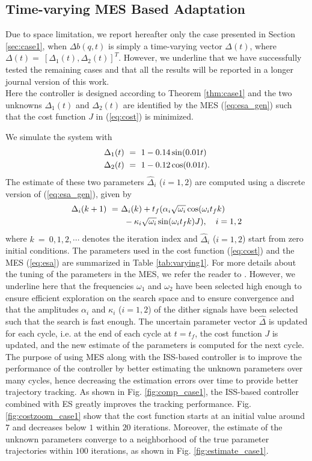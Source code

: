 \documentclass[twoside,leqno,onecolumn]{article}
\begin{document}
\subsection{Time-varying MES Based Adaptation}
\label{sec:constant} Due to space limitation, we report hereafter
only the case presented in Section \ref{sec:case1}, when $\Delta
b(q,t)$ is simply a time-varying vector $\Delta(t) $, where
$\Delta(t)  =~[\Delta_1(t), \Delta_2(t)]^T$. However, we underline
that we have successfully tested the remaining cases and that all
the results will be reported in a longer journal version of
this work.\\
Here the controller is designed according to Theorem
\ref{thm:case1} and the two unknowns $\Delta_1(t)$ and
$\Delta_2(t)$ are identified by the MES (\ref{eq:esa_gen}) such
that the cost function $J$ in (\ref{eq:cost}) is minimized.

We simulate the system with
\begin{align}
\label{eq:time-varying}
 {\Delta }_1(t)~&=~1 - 0.14\sin(0.01t)\notag\\
 {\Delta }_2(t)~&=~1 - 0.12\cos(0.01t).
\end{align}
The estimate of these two parameters $\widehat{\Delta}_i$ ($i =
1,2$) are computed using a discrete version of (\ref{eq:esa_gen}),
given by
\begin{align}
{\Delta}_i (k+1) ~=&~\Delta_i(k) + t_f(\alpha_i\sqrt{\omega_i}\cos(\omega_i t_f k)\notag\\
&~~-\kappa_i \sqrt{\omega_i} \sin(\omega_i t_f  k) J), \quad i
=1,2 \label{eq:esa}
\end{align}
where $k ~=~0,1,2,\cdots$ denotes the iteration index and
$\widehat{\Delta}_i$ ($i = 1,2$) start from zero initial
conditions. The parameters used in the cost function
(\ref{eq:cost}) and the MES (\ref{eq:esa}) are summarized in Table
\ref{tab:varying1}. For more details about the tuning of the
parameters in the MES, we refer the reader to \cite{Ariy03}.
However, we underline here that the frequencies $\omega_1$ and
$\omega_2$ have been selected high enough to ensure efficient
exploration on the search space and to ensure convergence and that
the amplitudes $\alpha_i$ and $\kappa_i$ ($i = 1,2$) of the dither
signals have been selected such that the search is fast enough.
The uncertain parameter vector $\widehat{\Delta}$ is updated for
each cycle, i.e. at the end of each cycle at $t = t_f$, the cost
function $J$ is updated, and the new estimate of the parameters is
computed for the next cycle. The purpose of using MES along with
the ISS-based controller is to improve the performance of the
controller by better estimating the unknown parameters over many
cycles, hence decreasing the estimation errors over time to
provide better trajectory tracking. As shown in Fig.
\ref{fig:comp_case1}, the ISS-based controller combined with ES
greatly improves the tracking performance. Fig.
\ref{fig:costzoom_case1} show that the cost function starts at an
initial value around $7$ and decreases below $1$ within $20$
iterations. Moreover, the estimate of the unknown parameters
converge to a neighborhood of the true parameter trajectories
within $100$ iterations, as shown in Fig.
\ref{fig:estimate_case1}.
\end{document}
